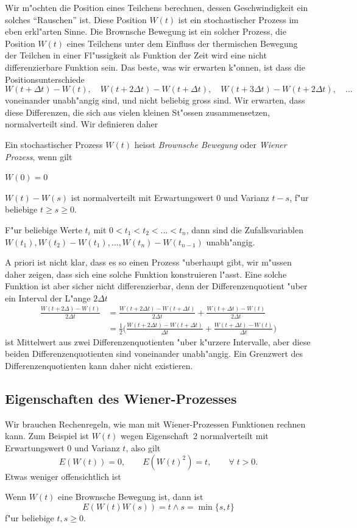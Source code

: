 Wir m"ochten die Position eines Teilchens berechnen, dessen Geschwindigkeit
ein solches ``Rauschen'' ist.
Diese Position $W(t)$ ist ein stochastischer Prozess im eben erkl"arten Sinne.
Die Brownsche Bewegung ist ein solcher Prozess, die Position $W(t)$ eines
Teilchens unter dem Einfluss der thermischen Bewegung der Teilchen
in einer Fl"ussigkeit als Funktion der Zeit wird eine nicht
differenzierbare Funktion sein.
Das beste, was wir erwarten k"onnen, ist dass die Positionsunterschiede
\[
W(t+\Delta t)-W(t),
\quad
W(t + 2\Delta t)-W(t+\Delta t),
\quad
W(t + 3\Delta t)-W(t+2\Delta t),\quad\dots
\]
voneinander unabh"angig sind, und nicht beliebig gross sind.
Wir erwarten, dass diese Differenzen, die sich aus vielen kleinen
St"ossen zusammensetzen, normalverteilt sind.
Wir definieren daher

\begin{definition}
Ein stochastischer Prozess $W(t)$ heisst {\em Brownsche Bewegung} oder
{\em Wiener Prozess}, wenn gilt
\begin{compactenum}
\item $W(0)=0$
\item $W(t)-W(s)$ ist normalverteilt mit Erwartungswert $0$ und
Varianz $t-s$, f"ur beliebige $t\ge s\ge 0$.
\item F"ur beliebige Werte $t_i$ mit $0<t_1<t_2<\dots<t_n$, dann sind
die Zufallsvariablen
$W(t_1), W(t_2)-W(t_1),\dots,W(t_n)-W(t_{n-1})$ unabh"angig.
\end{compactenum}
\end{definition}

A priori ist nicht klar, dass es so einen Prozess "uberhaupt gibt, wir
m"ussen daher zeigen, dass sich eine solche Funktion konstruieren l"asst.
Eine solche Funktion ist aber sicher nicht differenzierbar, denn
der Differenzenquotient "uber ein Interval der L"ange $2\Delta t$
\begin{align*}
\frac{W(t+2\Delta)-W(t)}{2\Delta t}
&=
\frac{W(t+2\Delta t)-W(t+\Delta t)}{2\Delta t}
+
\frac{W(t+\Delta t)-W(t)}{2\Delta t}
\\
&=
\frac12\biggl(
\frac{W(t+2\Delta t)-W(t+\Delta t)}{\Delta t}
+
\frac{W(t+\Delta t)-W(t)}{\Delta t}
\biggr)
\end{align*}
ist Mittelwert aus zwei Differenzenquotienten "uber k"urzere Intervalle,
aber diese beiden Differenzenquotienten sind voneinander unabh"angig.
Ein Grenzwert des Differenzenquotienten kann daher nicht existieren.

\subsection{Eigenschaften des Wiener-Prozesses}
Wir brauchen Rechenregeln, wie man mit Wiener-Prozessen Funktionen
rechnen kann.
Zum Beispiel ist $W(t)$ wegen Eigenschaft~2 normalverteilt mit Erwartungswert
$0$ und Varianz $t$, also gilt
\[
E(W(t))=0,\qquad E(W(t)^2)=t,\qquad \forall\;t>0.
\]
Etwas weniger offensichtlich ist
\begin{hilfssatz}
Wenn $W(t)$ eine Brownsche Bewegung ist, dann ist
\[
E(W(t)W(s)) = t\wedge s = \min\{s,t\}
\]
f"ur beliebige $t,s\ge 0$.
\end{hilfssatz}

